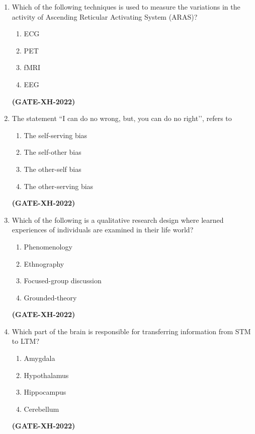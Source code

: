 \documentclass[journal]{IEEEtran}
\begin{document}
\begin{enumerate}
\item Which of the following techniques is used to measure the variations in the activity of Ascending Reticular Activating System (ARAS)?
\begin{multicols}{4}
\begin{enumerate}
\item ECG
\item PET
\item fMRI
\item EEG
\end{enumerate}
\end{multicols}
\hfill\textbf{(GATE-XH-2022)}

\item The statement ``I can do no wrong, but, you can do no right’’, refers to
\begin{multicols}{2}
\begin{enumerate}
\item The self-serving bias
\item The self-other bias
\item The other-self bias
\item The other-serving bias
\end{enumerate}
\end{multicols}
\hfill\textbf{(GATE-XH-2022)}

\item Which of the following is a qualitative research design where learned experiences of individuals are examined in their life world?
\begin{multicols}{2}
\begin{enumerate}
\item Phenomenology
\item Ethnography
\item Focused-group discussion
\item Grounded-theory
\end{enumerate}
\end{multicols}
\hfill\textbf{(GATE-XH-2022)}

\item Which part of the brain is responsible for transferring information from STM to LTM?
\begin{multicols}{4}
\begin{enumerate}
\item Amygdala
\item Hypothalamus
\item Hippocampus
\item Cerebellum
\end{enumerate}
\end{multicols}
\hfill\textbf{(GATE-XH-2022)}


\end{enumerate}
\end{document}

